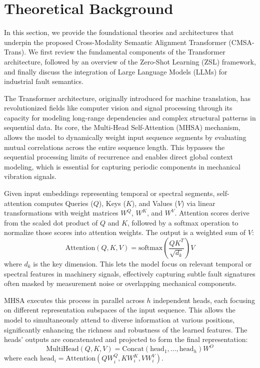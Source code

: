 \documentclass[journal]{IEEEtran}
\begin{document}
\section{Theoretical Background}
In this section, we provide the foundational theories and architectures that underpin the proposed Cross-Modality Semantic Alignment Transformer (CMSA-Trans). We first review the fundamental components of the Transformer architecture, followed by an overview of the Zero-Shot Learning (ZSL) framework, and finally discuss the integration of Large Language Models (LLMs) for industrial fault semantics.

The Transformer architecture, originally introduced for machine translation, has revolutionized fields like computer vision and signal processing through its capacity for modeling long-range dependencies and complex structural patterns in sequential data. Its core, the Multi-Head Self-Attention (MHSA) mechanism, allows the model to dynamically weight input sequence segments by evaluating mutual correlations across the entire sequence length. This bypasses the sequential processing limits of recurrence and enables direct global context modeling, which is essential for capturing periodic components in mechanical vibration signals.

Given input embeddings representing temporal or spectral segments, self-attention computes Queries ($Q$), Keys ($K$), and Values ($V$) via linear transformations with weight matrices $W^Q$, $W^K$, and $W^V$. Attention scores derive from the scaled dot product of $Q$ and $K$, followed by a softmax operation to normalize those scores into attention weights. The output is a weighted sum of $V$:
\begin{equation}
\text{Attention}(Q, K, V) = \text{softmax}\left(\frac{QK^T}{\sqrt{d_k}}\right)V
\end{equation}
where $d_k$ is the key dimension. This lets the model focus on relevant temporal or spectral features in machinery signals, effectively capturing subtle fault signatures often masked by measurement noise or overlapping mechanical components.

MHSA executes this process in parallel across $h$ independent heads, each focusing on different representation subspaces of the input sequence. This allows the model to simultaneously attend to diverse information at various positions, significantly enhancing the richness and robustness of the learned features. The heads' outputs are concatenated and projected to form the final representation:
\begin{equation}
\text{MultiHead}(Q, K, V) = \text{Concat}(\text{head}_1, \dots, \text{head}_h)W^O
\end{equation}
where each $\text{head}_i = \text{Attention}(QW_i^Q, KW_i^K, VW_i^V)$.
\end{document}
